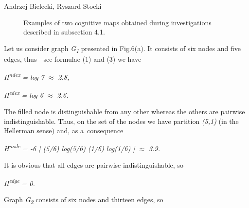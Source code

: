 \begin{artengenv2auth}{Andrzej Bielecki, Ryszard Stocki}
\begin{figure}[h]
\begin{adjustwidth}{-.1\textwidth}{}
\begin{minipage}{.6\linewidth}
\end{minipage}
\end{adjustwidth}
 \caption{Examples of two cognitive maps obtained during investigations described in subsection 4.1.}
 \label{fig:maps}
\end{figure}





Let us consider graph \textit{G}\textit{\textsubscript{1}} presented in Fig.6(a). It consists of six nodes and five edges, thus---see formulae (1) and (3) we have



\textit{H}\textit{\textsuperscript{ndex}} \textit{= log 7 ${\approx}$ 2.8,}





\textit{H}\textit{\textsuperscript{edex}} \textit{= log 6 ${\approx}$ 2.6.}





The filled node is distinguishable from any other whereas the others are pairwise indistinguishable. Thus, on the set of the nodes we have partition \textit{(5,1)} (in the Hellerman sense) and, as a~consequence



\textit{H}\textit{\textsuperscript{node}} \textit{= -6 [ (5/6) log(5/6) (1/6) log(1/6) ] ${\approx}$ 3.9.}





It is obvious that all edges are pairwise indistinguishable, so



\textit{H}\textit{\textsuperscript{edge}} \textit{= 0.}





Graph \textit{G}\textit{\textsubscript{2}} consists of six nodes and thirteen edges, so




\end{artengenv2auth}
